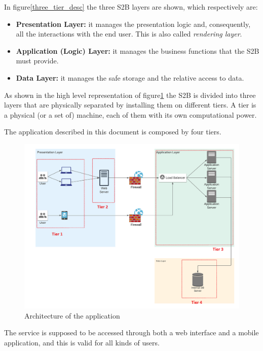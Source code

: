 \documentclass[table, 12pt]{article}
\begin{document}
In figure\ref{three_tier_desc} the three S2B layers are shown, which respectively are:
\begin{itemize}
    \item \textbf{Presentation Layer:} it manages the presentation logic and, consequently, all the interactions with the end user. This is also called \textit{rendering layer}.
    \item \textbf{Application (Logic) Layer:} it manages the business functions that the S2B must provide.
    \item \textbf{Data Layer:} it manages the safe storage and the relative access to data.
\end{itemize}

As shown in the high level representation of figure\ref{three_tier_application} the S2B is divided into three layers that are physically separated by installing them on different tiers. A tier is a physical (or a set of) machine, each of them with its own computational power.

The application described in this document is composed by four tiers.

\begin{figure}[H]
    \includegraphics[width=\textwidth]{assets/Architectural-Design/ApplicationArchitecture.png}
    \caption{Architecture of the application}\label{three_tier_application}
\end{figure}

The service is supposed to be accessed through both a web interface and a mobile application, and this is valid for all kinds of users.
\end{document}
